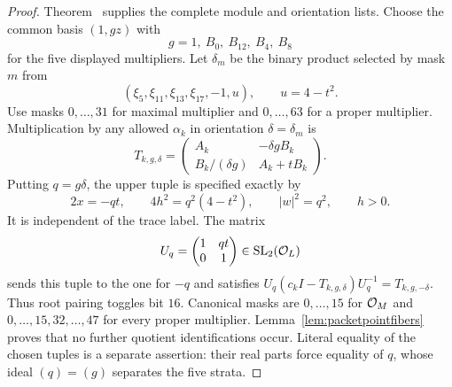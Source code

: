\begin{proof}
Theorem~ supplies the complete module and orientation
lists.  Choose the common basis $(1,gz)$ with
\[
 g=1,\ B_0,\ B_{12},\ B_4,\ B_8
\]
for the five displayed multipliers.  Let $\delta_m$ be the binary
product selected by mask $m$ from
\[
 (\xi_5,\xi_{11},\xi_{13},\xi_{17},-1,u),\qquad u=4-t^2.
\]
Use masks $0,\ldots,31$ for maximal multiplier and $0,\ldots,63$
for a proper multiplier.  Multiplication by any allowed $\alpha_k$
in orientation $\delta=\delta_m$ is
\[
 T_{k,g,\delta}=
 \begin{pmatrix}A_k&-\delta gB_k\\
 B_k/(\delta g)&A_k+tB_k\end{pmatrix}.
\]
Putting $q=g\delta$, the upper tuple is specified exactly by
\begin{equation}\label{eq:principalpacketpoint}
 2x=-qt,\qquad 4h^2=q^2(4-t^2),\qquad |w|^2=q^2,
 \qquad h>0.
\end{equation}
It is independent of the trace label.  The matrix
\[
 U_q=\begin{pmatrix}1&qt\\0&1\end{pmatrix}\in\operatorname{SL}_2(\mathcal O_L)
\]
sends this tuple to the one for $-q$ and satisfies
$U_q(c_kI-T_{k,g,\delta})U_q^{-1}=T_{k,g,-\delta}$.
Thus root pairing toggles bit $16$.  Canonical masks are $0,\ldots,15$
for $\mathcal O_M$ and $0,\ldots,15,32,\ldots,47$ for every proper multiplier.
Lemma~\ref{lem:packetpointfibers} proves that no further quotient
identifications occur.  Literal equality of the chosen tuples is a
separate assertion: their real parts force equality of $q$, whose ideal
$(q)=(g)$ separates the five strata.


\end{proof}
